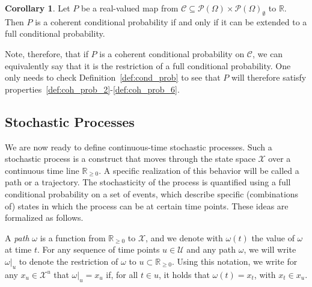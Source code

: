 \documentclass[10pt,a4paper]{paper}
\theoremstyle{definition}
\newtheorem{corollary}[theorem]{Corollary}
\newcommand{\reals}{\mathbb{R}}
\newcommand{\realsnonneg}{\reals_{\geq 0}}
\newcommand{\states}{\mathcal{X}}
\newcommand{\paths}{\Omega}
\newcommand{\power}{\mathcal{P}(\paths)}
\newcommand{\nonemptypower}{\power_{\emptyset}}
\begin{document}
\begin{corollary}\label{corol:coherentextendable}
Let $P$ be a real-valued map from $\mathcal{C}\subseteq\power\times\nonemptypower$ to $\reals$. Then $P$ is a coherent conditional probability if and only if it can be extended to a full conditional probability.
\end{corollary}
Note, therefore, that if $P$ is a coherent conditional probability on $\mathcal{C}$, we can equivalently say that it is the restriction of a full conditional probability. One only needs to check Definition~\ref{def:cond_prob} to see that $P$ will therefore satisfy properties~\ref{def:coh_prob_2}-\ref{def:coh_prob_6}.

\subsection{Stochastic Processes}\label{sec:def_stochastic_processes}

We are now ready to define continuous-time stochastic processes. Such a stochastic process is a construct that moves through the state space $\states$ over a continuous time line $\realsnonneg$. A specific realization of this behavior will be called a path or a trajectory. The stochasticity of the process is quantified using a full conditional probability on a set of events, which describe specific (combinations of) states in which the process can be at certain time points. These ideas are formalized as follows.


A \emph{path} $\omega$ is a function from $\realsnonneg$ to $\states$, and we denote with $\omega(t)$ the value of $\omega$ at time $t$. For any sequence of time points $u\in\mathcal{U}$ and any path $\omega$, we will write $\omega\vert_{u}$ to denote the restriction of $\omega$ to $u\subset\realsnonneg$. Using this notation, we write for any $x_u\in\states^u$ that $\omega\vert_u=x_u$ if, for all $t\in u$, it holds that $\omega(t)=x_{t}$, with $x_t\in x_u$.
\end{document}
